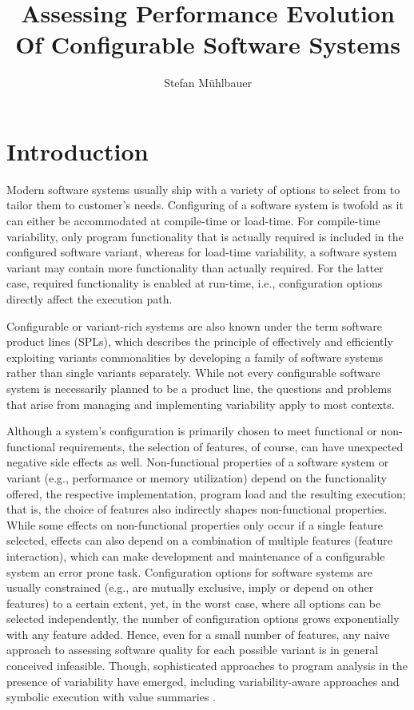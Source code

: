 \documentclass[bibliography=totoc]{tubsreprt}
\title{Assessing Performance Evolution Of Configurable Software Systems}
\author{Stefan Mühlbauer}
\begin{document}
\maketitle

\tableofcontents
\newpage

\setcounter{page}{1}
\chapter{Introduction}
Modern software systems usually ship with a variety of options to select from to tailor them to customer’s needs.
Configuring of a software system is twofold as it can either be accommodated at compile-time or load-time. For
compile-time variability, only program functionality that is actually required is included in the configured
software variant, whereas for load-time variability, a software system variant may contain more functionality
than actually required. For the latter case, required functionality is enabled at run-time, i.e., configuration
options directly affect the execution path.

Configurable or variant-rich systems are also known under the term software product lines (SPLs), which
describes the principle of effectively and efficiently exploiting variants commonalities by developing a family
of software systems rather than single variants separately. While not every configurable software system is
necessarily planned to be a product line, the questions and problems that arise from managing and implementing
variability apply to most contexts.

Although a system’s configuration is primarily chosen to meet functional or non-functional requirements, the
selection of features, of course, can have unexpected negative side effects as well. Non-functional properties
of a software system or variant (e.g., performance or memory utilization) depend on the functionality offered,
the respective implementation, program load and the resulting execution; that is, the choice of features also
indirectly shapes non-functional properties. While some effects on non-functional properties only occur if a
single feature selected, effects can also depend on a combination of multiple features (feature interaction),
which can make development and maintenance of a configurable system an error prone task.
Configuration options for software systems are usually constrained (e.g., are mutually exclusive, imply or depend
on other features) to a certain extent, yet, in the worst case, where all options can be selected independently, the
number of configuration options grows exponentially with any feature added. Hence, even for a small number
of features, any naive approach to assessing software quality for each possible variant is in general conceived
infeasible. Though, sophisticated approaches to program analysis in the presence of variability have emerged,
including variability-aware approaches \cite{thum_classification_2014} and
symbolic execution with value summaries \cite{sen_multise:_2015}.
\end{document}
